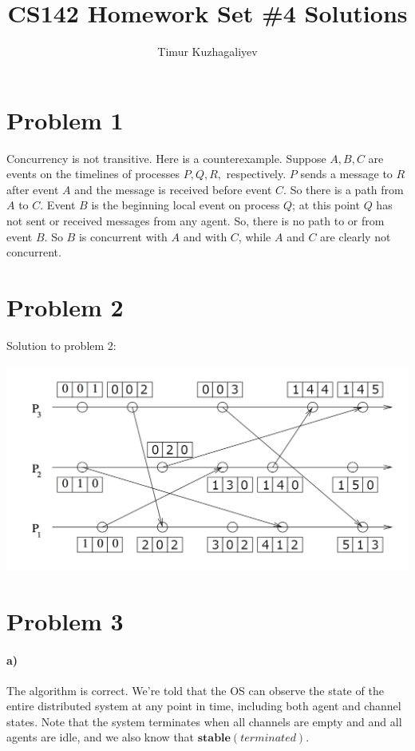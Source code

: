 \documentclass[10pt,letter]{article}
\begin{document}
\title{CS142 Homework Set \#4 Solutions}

\author{Timur Kuzhagaliyev}

 
\maketitle 

\section*{Problem 1}

Concurrency is not transitive. Here is a counterexample. Suppose $A, B, C$ are
events on the timelines of processes $P, Q, R,$ respectively. $P$ sends a message to $R$ after event
$A$ and the message is received before event $C$. So there is a path from $A$ to $C$. Event $B$ is the
beginning local event on process $Q$; at this point $Q$ has not sent or received messages from
any agent. So, there is no path to or from event $B$. So $B$ is concurrent with $A$ and with $C$,
while $A$ and $C$ are clearly not concurrent.

\section*{Problem 2}

Solution to problem 2:

\includegraphics[width=\textwidth,height=\textheight,keepaspectratio]{hw4_problem2}

\section*{Problem 3}

\paragraph{a)} The algorithm is correct. We're told that the OS can observe the state of the entire distributed system at any point in time, including both agent and channel states. Note that the system terminates when all channels are empty and and all agents are idle, and we also know that $\textbf{stable}(terminated)$.
\end{document}
